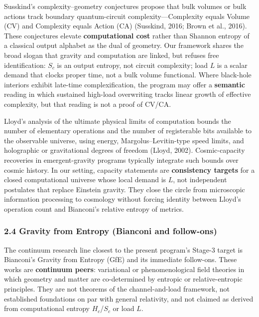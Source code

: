 \documentclass[
  11pt,
]{article}
\begin{document}
Susskind's complexity--geometry conjectures propose that bulk volumes or
bulk actions track boundary quantum-circuit complexity---Complexity
equals Volume (CV) and Complexity equals Action (CA) (Susskind, 2016;
Brown et al., 2016). These conjectures elevate \textbf{computational
cost} rather than Shannon entropy of a classical output alphabet as the
dual of geometry. Our framework shares the broad slogan that gravity and
computation are linked, but refuses free identification: \(S_c\) is an
output entropy, not circuit complexity; load \(L\) is a scalar demand
that clocks proper time, not a bulk volume functional. Where black-hole
interiors exhibit late-time complexification, the program may offer a
\textbf{semantic} reading in which sustained high-load overwriting
tracks linear growth of effective complexity, but that reading is not a
proof of CV/CA.

Lloyd's analysis of the ultimate physical limits of computation bounds
the number of elementary operations and the number of registerable bits
available to the observable universe, using energy,
Margolus--Levitin-type speed limits, and holographic or gravitational
degrees of freedom (Lloyd, 2002). Cosmic-capacity recoveries in
emergent-gravity programs typically integrate such bounds over cosmic
history. In our setting, capacity statements are \textbf{consistency
targets} for a closed computational universe whose local demand is
\(L\), not independent postulates that replace Einstein gravity. They
close the circle from microscopic information processing to cosmology
without forcing identity between Lloyd's operation count and Bianconi's
relative entropy of metrics.

\subsubsection{2.4 Gravity from Entropy (Bianconi and
follow-ons)}\label{gravity-from-entropy-bianconi-and-follow-ons}

The continuum research line closest to the present program's Stage-3
target is Bianconi's Gravity from Entropy (GfE) and its immediate
follow-ons. These works are \textbf{continuum peers}: variational or
phenomenological field theories in which geometry and matter are
co-determined by entropic or relative-entropic principles. They are not
theorems of the channel-and-load framework, not established foundations
on par with general relativity, and not claimed as derived from
computational entropy \(H_c\)/\(S_c\) or load \(L\).
\end{document}
